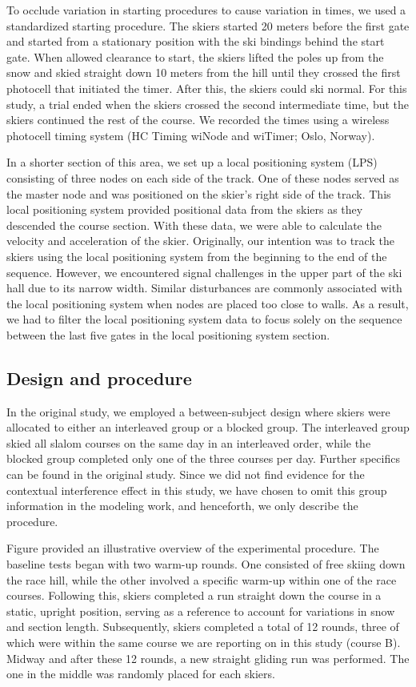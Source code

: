 \documentclass{article}
\begin{document}
To occlude variation in starting procedures to cause variation in times, we used a standardized starting procedure. The skiers started 20 meters before the first gate and started from a stationary position with the ski bindings behind the start gate. When allowed clearance to start, the skiers lifted the poles up from the snow and skied straight down 10 meters from the hill until they crossed the first photocell that initiated the timer. After this, the skiers could ski normal. For this study, a trial ended when the skiers crossed the second intermediate time, but the skiers continued the rest of the course. We recorded the times using a wireless photocell timing system (HC Timing wiNode and wiTimer; Oslo, Norway).

In a shorter section of this area, we set up a local positioning system (LPS) consisting of three nodes on each side of the track. One of these nodes served as the master node and was positioned on the skier's right side of the track. This local positioning system provided positional data from the skiers as they descended the course section. With these data, we were able to calculate the velocity and acceleration of the skier. Originally, our intention was to track the skiers using the local positioning system from the beginning to the end of the sequence. However, we encountered signal challenges in the upper part of the ski hall due to its narrow width. Similar disturbances are commonly associated with the local positioning system when nodes are placed too close to walls. As a result, we had to filter the local positioning system data to focus solely on the sequence between the last five gates in the local positioning system section.

\subsection{Design and procedure}
In the original study, we employed a between-subject design where skiers were allocated to either an interleaved group or a blocked group. The interleaved group skied all slalom courses on the same day in an interleaved order, while the blocked group completed only one of the three courses per day. Further specifics can be found in the original study. Since we did not find evidence for the contextual interference effect in this study, we have chosen to omit this group information in the modeling work, and henceforth, we only describe the procedure.

Figure provided an illustrative overview of the experimental procedure. The baseline tests began with two warm-up rounds. One consisted of free skiing down the race hill, while the other involved a specific warm-up within one of the race courses. Following this, skiers completed a run straight down the course in a static, upright position, serving as a reference to account for variations in snow and section length. Subsequently, skiers completed a total of 12 rounds, three of which were within the same course we are reporting on in this study (course B). Midway and after these 12 rounds, a new straight gliding run was performed. The one in the middle was randomly placed for each skiers.
\end{document}
